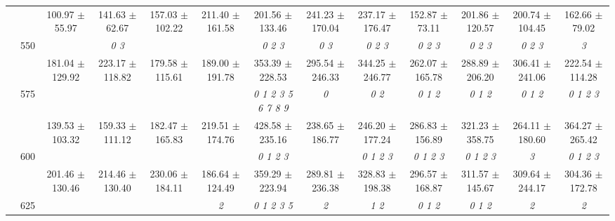 \begin{table}[h]
{\begin{tabular}{
        ccccccccccccc}
 & & \cellcolor[HTML]{EFEFEF} 100.97 $\pm$ 55.97& \cellcolor[HTML]{EFEFEF} 141.63 $\pm$ 62.67& \cellcolor[HTML]{EFEFEF} 157.03 $\pm$ 102.22& \cellcolor[HTML]{EFEFEF} 211.40 $\pm$ 161.58& \cellcolor[HTML]{EFEFEF} 201.56 $\pm$ 133.46& \cellcolor[HTML]{EFEFEF} 241.23 $\pm$ 170.04& \cellcolor[HTML]{EFEFEF} 237.17 $\pm$ 176.47& \cellcolor[HTML]{EFEFEF} 152.87 $\pm$ 73.11& \cellcolor[HTML]{EFEFEF} 201.86 $\pm$ 120.57& \cellcolor[HTML]{EFEFEF} 200.74 $\pm$ 104.45& \cellcolor[HTML]{EFEFEF} 162.66 $\pm$ 79.02 \\ 
 & \multirow{2}{*}{550}& & \textit{ 0 3 }& & & \textit{ 0 2 3 }& \textit{ 0 3 }& \textit{ 0 2 3 }& \textit{ 0 2 3 }& \textit{ 0 2 3 }& \textit{ 0 2 3 }& \textit{ 3 } \\ 
 & & 181.04 $\pm$ 129.92& 223.17 $\pm$ 118.82& 179.58 $\pm$ 115.61& 189.00 $\pm$ 191.78& 353.39 $\pm$ 228.53& 295.54 $\pm$ 246.33& 344.25 $\pm$ 246.77& 262.07 $\pm$ 165.78& 288.89 $\pm$ 206.20& 306.41 $\pm$ 241.06& 222.54 $\pm$ 114.28 \\ 
 & \multirow{2}{*}{575}& \cellcolor[HTML]{EFEFEF} & \cellcolor[HTML]{EFEFEF} & \cellcolor[HTML]{EFEFEF} & \cellcolor[HTML]{EFEFEF} & \cellcolor[HTML]{EFEFEF} \textit{ 0 1 2 3 5 6 7 8 9 }& \cellcolor[HTML]{EFEFEF} \textit{ 0 }& \cellcolor[HTML]{EFEFEF} \textit{ 0 2 }& \cellcolor[HTML]{EFEFEF} \textit{ 0 1 2 }& \cellcolor[HTML]{EFEFEF} \textit{ 0 1 2 }& \cellcolor[HTML]{EFEFEF} \textit{ 0 1 2 }& \cellcolor[HTML]{EFEFEF} \textit{ 0 1 2 3 } \\ 
 & & \cellcolor[HTML]{EFEFEF} 139.53 $\pm$ 103.32& \cellcolor[HTML]{EFEFEF} 159.33 $\pm$ 111.12& \cellcolor[HTML]{EFEFEF} 182.47 $\pm$ 165.83& \cellcolor[HTML]{EFEFEF} 219.51 $\pm$ 174.76& \cellcolor[HTML]{EFEFEF} 428.58 $\pm$ 235.16& \cellcolor[HTML]{EFEFEF} 238.65 $\pm$ 186.77& \cellcolor[HTML]{EFEFEF} 246.20 $\pm$ 177.24& \cellcolor[HTML]{EFEFEF} 286.83 $\pm$ 156.89& \cellcolor[HTML]{EFEFEF} 321.23 $\pm$ 358.75& \cellcolor[HTML]{EFEFEF} 264.11 $\pm$ 180.60& \cellcolor[HTML]{EFEFEF} 364.27 $\pm$ 265.42 \\ 
 & \multirow{2}{*}{600}& & & & & \textit{ 0 1 2 3 }& & \textit{ 0 1 2 3 }& \textit{ 0 1 2 3 }& \textit{ 0 1 2 3 }& \textit{ 3 }& \textit{ 0 1 2 3 } \\ 
 & & 201.46 $\pm$ 130.46& 214.46 $\pm$ 130.40& 230.06 $\pm$ 184.11& 186.64 $\pm$ 124.49& 359.29 $\pm$ 223.94& 289.81 $\pm$ 236.38& 328.83 $\pm$ 198.38& 296.57 $\pm$ 168.87& 311.57 $\pm$ 145.67& 309.64 $\pm$ 244.17& 304.36 $\pm$ 172.78 \\ 
 & \multirow{2}{*}{625}& \cellcolor[HTML]{EFEFEF} & \cellcolor[HTML]{EFEFEF} & \cellcolor[HTML]{EFEFEF} & \cellcolor[HTML]{EFEFEF} \textit{ 2 }& \cellcolor[HTML]{EFEFEF} \textit{ 0 1 2 3 5 }& \cellcolor[HTML]{EFEFEF} \textit{ 2 }& \cellcolor[HTML]{EFEFEF} \textit{ 1 2 }& \cellcolor[HTML]{EFEFEF} \textit{ 0 1 2 }& \cellcolor[HTML]{EFEFEF} \textit{ 0 1 2 }& \cellcolor[HTML]{EFEFEF} \textit{ 2 }& \cellcolor[HTML]{EFEFEF} \textit{ 2 } \\ 

\end{tabular}}
\end{table}
